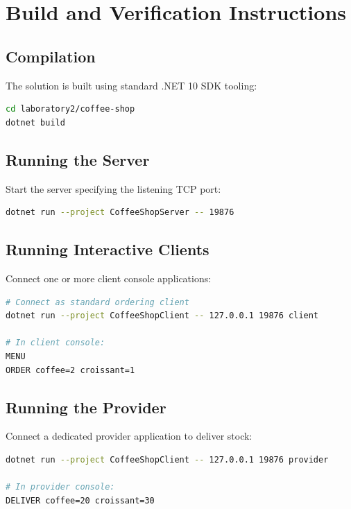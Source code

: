 \documentclass[11pt,a4paper]{article}
\begin{document}
\section{Build and Verification Instructions}

\subsection{Compilation}
The solution is built using standard .NET 10 SDK tooling:
\begin{lstlisting}[language=bash]
cd laboratory2/coffee-shop
dotnet build
\end{lstlisting}

\subsection{Running the Server}
Start the server specifying the listening TCP port:
\begin{lstlisting}[language=bash]
dotnet run --project CoffeeShopServer -- 19876
\end{lstlisting}

\subsection{Running Interactive Clients}
Connect one or more client console applications:
\begin{lstlisting}[language=bash]
# Connect as standard ordering client
dotnet run --project CoffeeShopClient -- 127.0.0.1 19876 client

# In client console:
MENU
ORDER coffee=2 croissant=1
\end{lstlisting}

\subsection{Running the Provider}
Connect a dedicated provider application to deliver stock:
\begin{lstlisting}[language=bash]
dotnet run --project CoffeeShopClient -- 127.0.0.1 19876 provider

# In provider console:
DELIVER coffee=20 croissant=30
\end{lstlisting}
\end{document}
